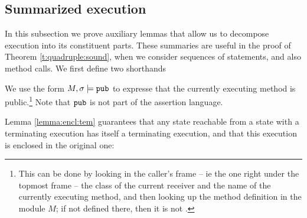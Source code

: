 

\subsection{Summarized  execution} 
\label{sect:termExecs}

In this subsection we prove auxiliary lemmas that allow us to decompose execution into its constituent parts. 
These summaries are useful in the proof of Theorem \ref{t:quadruple:sound}, when we consider sequences of statements, and also method calls.
We first define two shorthands
 
\begin{definition}
We use the form
$M, \sigma \models \mbox{\normalfont{\texttt{pub}}}$ to expresse that the currently executing method is public.\footnote{This can be done by looking in the caller's frame -- ie the one right under the topmost frame -- the class of the current receiver and the name of the currently executing method, and then looking up the method definition in the module $M$; if not defined there, then it is not . }
Note that $\mbox{\normalfont{\texttt{pub}}}$ is not part of the assertion language.
\end{definition}
 


\label{sect:termExecs}

 
Lemma \ref{lemma:encl:tem} guarantees that any state reachable from a state with a terminating execution has itself a terminating execution, and that this execution is enclosed in the original one:
 
